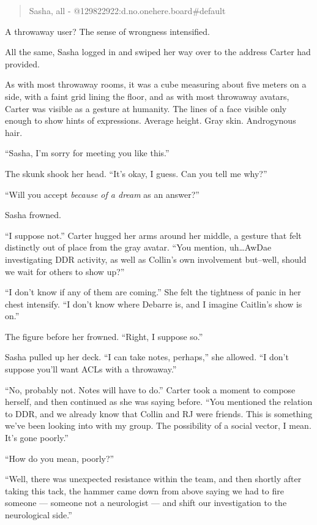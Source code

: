\begin{quote}
Sasha, all - @129822922:d.no.onehere.board\#default
\end{quote}

A throwaway user? The sense of wrongness intensified.

All the same, Sasha logged in and swiped her way over to the address Carter had provided.

As with most throwaway rooms, it was a cube measuring about five meters on a side, with a faint grid lining the floor, and as with most throwaway avatars, Carter was visible as a gesture at humanity. The lines of a face visible only enough to show hints of expressions. Average height. Gray skin. Androgynous hair.

``Sasha, I'm sorry for meeting you like this.''

The skunk shook her head. ``It's okay, I guess. Can you tell me why?''

``Will you accept \emph{because of a dream} as an answer?''

Sasha frowned.

``I suppose not.'' Carter hugged her arms around her middle, a gesture that felt distinctly out of place from the gray avatar. ``You mention, uh\ldots{}AwDae investigating DDR activity, as well as Collin's own involvement but--well, should we wait for others to show up?''

``I don't know if any of them are coming.'' She felt the tightness of panic in her chest intensify. ``I don't know where Debarre is, and I imagine Caitlin's show is on.''

The figure before her frowned. ``Right, I suppose so.''

Sasha pulled up her deck. ``I can take notes, perhaps,'' she allowed. ``I don't suppose you'll want ACLs with a throwaway.''

``No, probably not. Notes will have to do.'' Carter took a moment to compose herself, and then continued as she was saying before. ``You mentioned the relation to DDR, and we already know that Collin and RJ were friends. This is something we've been looking into with my group. The possibility of a social vector, I mean. It's gone poorly.''

``How do you mean, poorly?''

``Well, there was unexpected resistance within the team, and then shortly after taking this tack, the hammer came down from above saying we had to fire someone --- someone not a neurologist --- and shift our investigation to the neurological side.''

